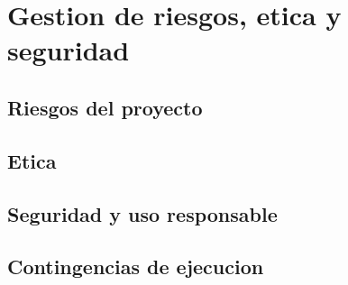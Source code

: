 \section{Gestion de riesgos, etica y seguridad}

\subsection{Riesgos del proyecto}

\subsection{Etica}

\subsection{Seguridad y uso responsable}

\subsection{Contingencias de ejecucion}
